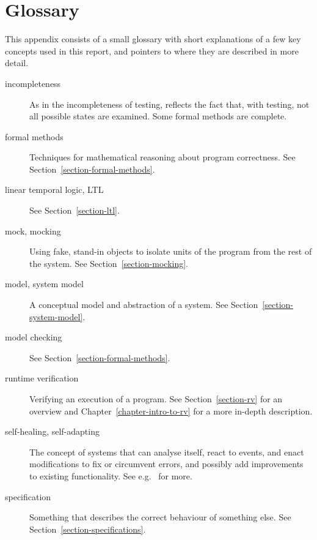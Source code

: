 \documentclass[a4paper,11pt]{kth-mag}
\theoremstyle{definition}
\begin{document}

\appendix
\addappheadtotoc

\chapter{Glossary} \label{appendix-glossary}

This appendix consists of a small glossary with short explanations of a few
key concepts used in this report, and pointers to where they are described in
more detail.

\begin{description}
  \item[incompleteness] As in the incompleteness of testing, reflects the fact
    that, with testing, not all possible states are examined. Some formal
    methods are complete.

  \item[formal methods] Techniques for mathematical reasoning about program
    correctness. See Section~\ref{section-formal-methods}.

  \item[linear temporal logic, LTL] See Section~\ref{section-ltl}.

  \item[mock, mocking] Using fake, stand-in objects to isolate units of the
    program from the rest of the system. See Section~\ref{section-mocking}.

  \item[model, system model] A conceptual model and abstraction of a system.
    See Section~\ref{section-system-model}.

  \item[model checking] See Section~\ref{section-formal-methods}.

  \item[runtime verification] Verifying an execution of a program. See
    Section~\ref{section-rv} for an overview and
    Chapter~\ref{chapter-intro-to-rv} for a more in-depth description.

  \item[self-healing, self-adapting] The concept of systems that can analyse
    itself, react to events, and enact modifications to fix or circumvent
    errors, and possibly add improvements to existing functionality. See e.g.\
    \cite{huebscher08survey} for more.

  \item[specification] Something that describes the correct behaviour of
    something else. See Section~\ref{section-specifications}.


\end{description}
\end{document}
